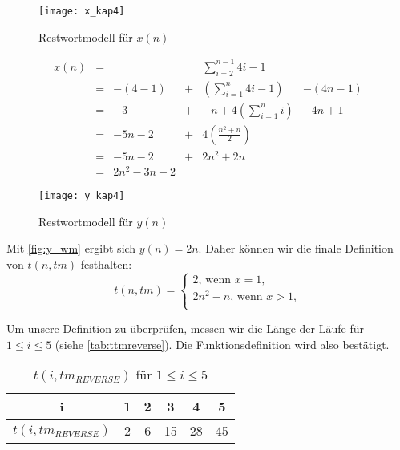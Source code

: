 \begin{figure}[hb]
    \caption{Restwortmodell für $x(n)$}
    \centering
    \texttt{[image: x\_kap4]}%
    \label{fig:x_wm}
\end{figure}



\begin{align*}
    x(n) &=&                &   & \sum_{i=2}^{n-1} 4i - 1     &            \\ 
         &=& -(4 - 1)       & + & (\sum_{i=1}^{n} 4i -1)      & - (4n - 1) \\
         &=& -3             & + & -n + 4 (\sum_{i=1}^{n} i)   &  - 4n + 1  \\
         &=& -5n -2         & + & 4 (\frac{n^2+n}{2})         &            \\
         &=& -5n -2         & + & 2 n^2 + 2n                  &            \\
         &=& 2n^2 -3n -2    &   &                             &            
\end{align*}


\begin{figure}[hb]
    \caption{Restwortmodell für $y(n)$}
    \centering
    \texttt{[image: y\_kap4]}%
    \label{fig:y_wm}
\end{figure}

Mit \autoref{fig:y_wm} ergibt sich $y(n) = 2n$.
Daher können wir die finale Definition von $t(n, tm)$ festhalten:
\[
    t(n, tm) = \begin{cases}
        2\text{, wenn } x = 1,\\
        2 n^2 -n \text{, wenn } x > 1,\\
    \end{cases}
\]

Um unsere Definition zu überprüfen, messen wir die Länge der Läufe für  $1 \leq i \leq 5$
(siehe \autoref{tab:ttmreverse}).
Die Funktionsdefinition wird also bestätigt.
\begin{table}[ht]
    \caption{$t(i,tm_{REVERSE})$ für $1 \leq i \leq 5$}
    \centering
    \begin{tabular}{c c c c c c}
    \toprule
          i
        & 1
        & 2
        & 3
        & 4
        & 5
        \\
        \midrule
          $t(i,tm_{REVERSE})$
        & 2
        & 6
        & 15
        & 28
        & 45
        \\
    \bottomrule
    \end{tabular}%
    \label{tab:ttmreverse}
\end{table}


